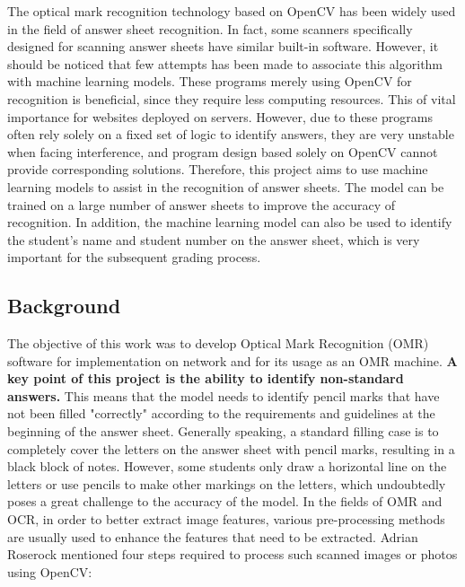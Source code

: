 \documentclass[twocolumn]{article}
\begin{document}
        The optical mark recognition technology based on OpenCV has been widely used in the field of answer sheet recognition. In fact, some scanners specifically designed for scanning answer sheets have similar built-in  software. However, it should be noticed that few attempts has been made to associate this algorithm with machine learning models. These programs merely using OpenCV for recognition is beneficial, since they require less computing resources. This of vital importance for websites deployed on servers. However, due to these programs often rely solely on a fixed set of logic to identify answers, they are very unstable when facing interference, and program design based solely on OpenCV cannot provide corresponding solutions. Therefore, this project aims to use machine learning models to assist in the recognition of answer sheets. The model can be trained on a large number of answer sheets to improve the accuracy of recognition. In addition, the machine learning model can also be used to identify the student's name and student number on the answer sheet, which is very important for the subsequent grading process.
       
    \subsection{Background}
        The objective of this work was to develop Optical Mark Recognition (OMR) software for implementation on network and for its usage as an OMR machine. \textbf{A key point of this project is the ability to identify non-standard answers. }This means that the model needs to identify pencil marks that have not been filled "correctly" according to the requirements and guidelines at the beginning of the answer sheet. Generally speaking, a standard filling case is to completely cover the letters on the answer sheet with pencil marks, resulting in a black block of notes. However, some students only draw a horizontal line on the letters or use pencils to make other markings on the letters, which undoubtedly poses a great challenge to the accuracy of the model\cite{OCR_1}. In the fields of OMR and OCR, in order to better extract image features, various pre-processing methods are usually used to enhance the features that need to be extracted. Adrian Roserock\cite{CV_1} mentioned four steps required to process such scanned images or photos using OpenCV\cite{opencv}:
\end{document}

